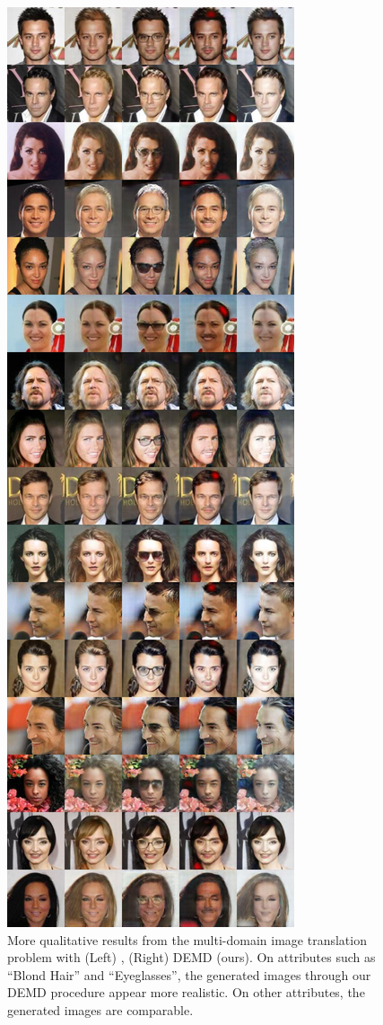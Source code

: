 \begin{figure}
    \includegraphics[height=0.85\textheight]{6_demd/figs/mwgan_res/demd-00001-images.jpg}
    \caption{More qualitative results from the multi-domain image translation problem with (Left) \cite{cao2019multi}, (Right) DEMD (ours). On attributes such as ``Blond Hair'' and ``Eyeglasses'', the generated images through our DEMD procedure appear more realistic. On other attributes, the generated images are comparable. }
    \label{fig:moreganres1}
\end{figure}

